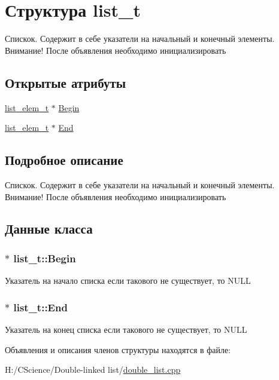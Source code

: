 \hypertarget{structlist__t}{
\section{Структура list\_\-t}
\label{structlist__t}
}


Спискок. Содержит в себе указатели на начальный и конечный элементы. Внимание! После объявления необходимо инициализировать  


\subsection*{Открытые атрибуты}
\begin{DoxyCompactItemize}
\item 
\hyperlink{structlist__elem__t}{list\_\-elem\_\-t} $\ast$ \hyperlink{structlist__t_a08db40bb752a8dc48d3e418c8415ea1a}{Begin}
\item 
\hyperlink{structlist__elem__t}{list\_\-elem\_\-t} $\ast$ \hyperlink{structlist__t_a31171bcda743d9f835db9ae3de9511ea}{End}
\end{DoxyCompactItemize}


\subsection{Подробное описание}
Спискок. Содержит в себе указатели на начальный и конечный элементы. Внимание! После объявления необходимо инициализировать 

\subsection{Данные класса}
\hypertarget{structlist__t_a08db40bb752a8dc48d3e418c8415ea1a}{
\subsubsection[{Begin}]{$\ast$ {\bf list\_\-t::Begin}}}
\label{structlist__t_a08db40bb752a8dc48d3e418c8415ea1a}
Указатель на начало списка если такового не существует, то NULL \hypertarget{structlist__t_a31171bcda743d9f835db9ae3de9511ea}{
\subsubsection[{End}]{$\ast$ {\bf list\_\-t::End}}}
\label{structlist__t_a31171bcda743d9f835db9ae3de9511ea}
Указатель на конец списка если такового не существует, то NULL 

Объявления и описания членов структуры находятся в файле:\begin{DoxyCompactItemize}
\item 
H:/CScience/Double-\/linked list/\hyperlink{double__list_8cpp}{double\_\-list.cpp}\end{DoxyCompactItemize}
